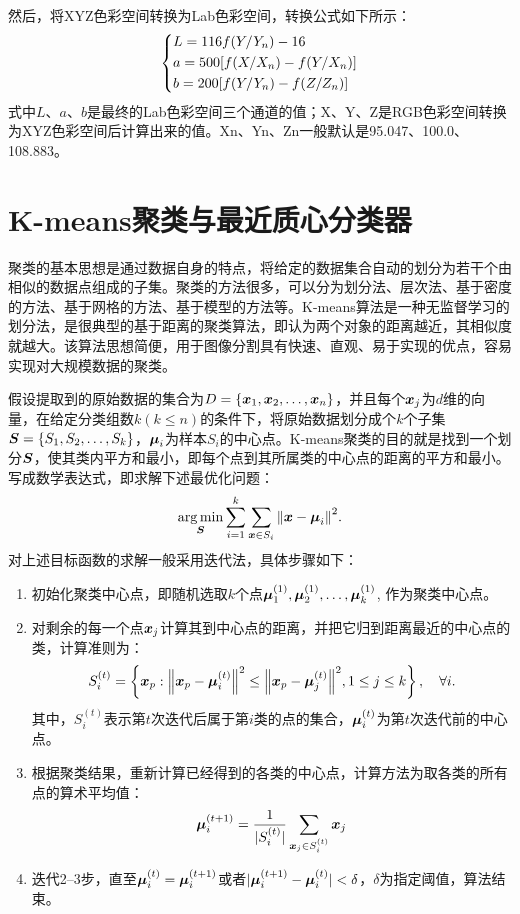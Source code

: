 \documentclass[UTF8,a4paper,twoside]{ctexart}
\DeclareMathOperator*{\argmin}{arg\,min}
\begin{document}
然后，将XYZ色彩空间转换为Lab色彩空间，转换公式如下所示：
\begin{equation}
  \left\{
    \begin{lgathered}
      L = 116 f(Y/Y_n) - 16 \\
      a = 500[f(X/X_n) - f(Y/X_n)] \\
      b = 200[f(Y/Y_n) - f(Z/Z_n)]
    \end{lgathered}
  \right.
\end{equation}
式中$L$、$a$、$b$是最终的Lab色彩空间三个通道的值；X、Y、Z是RGB色彩空间转换为XYZ色彩空间后计算出来的值。Xn、Yn、Zn一般默认是95.047、100.0、108.883。

\section{K-means聚类与最近质心分类器}

聚类的基本思想是通过数据自身的特点，将给定的数据集合自动的划分为若干个由相似的数据点组成的子集。聚类的方法很多，可以分为划分法、层次法、基于密度的方法、基于网格的方法、基于模型的方法等。K-means算法\cite{蒋帅2010k,吴晓蓉2008k}是一种无监督学习的划分法，是很典型的基于距离的聚类算法，即认为两个对象的距离越近，其相似度就越大。该算法思想简便，用于图像分割具有快速、直观、易于实现的优点，容易实现对大规模数据的聚类。

假设提取到的原始数据的集合为$D = \{\vb*{x}_1, \vb*{x}_2, \ldots, \vb*{x}_n\}$，并且每个$\vb*{x}_j$为$d$维的向量，在给定分类组数$k(k\leq n)$的条件下，将原始数据划分成个$k$个子集$\vb*{S} = \{S_1, S_2, \ldots, S_k\}$，$\vb*{\mu}_i$为样本$S_i$的中心点。K-means聚类的目的就是找到一个划分$\vb*{S}$，使其类内平方和最小，即每个点到其所属类的中心点的距离的平方和最小。写成数学表达式，即求解下述最优化问题：
\begin{equation}
  \argmin_{\vb*{S}} \sum_{i = 1}^k \sum_{\vb*{x} \in S_i} \norm{\vb*{x} - \vb*{\mu}_i}^2.
\end{equation}
对上述目标函数的求解一般采用迭代法，具体步骤如下：
\begin{enumerate}
\item 初始化聚类中心点，即随机选取$k$个点$\vb*{\mu}_1^{(1)}, \vb*{\mu}_2^{(1)}, \ldots, \vb*{\mu}_k^{(1)}$, 作为聚类中心点。
\item 对剩余的每一个点$\vb*{x}_j$计算其到中心点的距离，并把它归到距离最近的中心点的类，计算准则为：
  \begin{equation}
    S_i^{(t)} = \left\{ \vb*{x}_p : \norm{\vb*{x}_p - \vb*{\mu}_i^{(t)}}^2 \leq \norm{\vb*{x}_p - \vb*{\mu}_j^{(t)}}^2 , 1 \leq j \leq k \right\}, \quad \forall i.
  \end{equation}
  其中，$S_i^{(t)}$表示第$t$次迭代后属于第$i$类的点的集合，$\vb*{\mu}_i^{(t)}$为第$t$次迭代前的中心点。
\item 根据聚类结果，重新计算已经得到的各类的中心点，计算方法为取各类的所有点的算术平均值：
  \begin{equation}
    \vb*{\mu}_i^{(t+1)} = \frac{1}{|S_i^{(t)}|} \sum_{\vb*{x}_j \in S_i^{(t)}} \vb*{x}_j
  \end{equation}
\item 迭代2--3步，直至$\vb*{\mu}_i^{(t)} = \vb*{\mu}_i^{(t+1)}$或者$|\vb*{\mu}_i^{(t+1)} - \vb*{\mu}_i^{(t)}| < \delta$，$\delta$为指定阈值，算法结束。
\end{enumerate}
\end{document}
